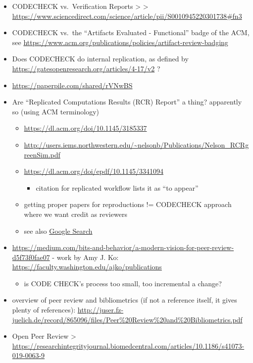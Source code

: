 \documentclass[12pt]{article}
\begin{document}
\begin{itemize}
\item
  CODECHECK vs.~Verification Reports \textgreater{} \textgreater{}
  \url{https://www.sciencedirect.com/science/article/pii/S0010945220301738\#fn3}
\item
  CODECHECK vs.~the ``Artifacts Evaluated - Functional'' badge of the
  ACM, see
  \url{https://www.acm.org/publications/policies/artifact-review-badging}
\item
  Does CODECHECK do internal replication, as defined by
  \url{https://gatesopenresearch.org/articles/4-17/v2} ?
\item
  \url{https://paperpile.com/shared/rVNwBS}
\item
  Are ``Replicated Computations Results (RCR) Report'' a thing?
  apparently so (using ACM terminology)

  \begin{itemize}
  \item
    \url{https://dl.acm.org/doi/10.1145/3185337}
  \item
    \url{http://users.iems.northwestern.edu/~nelsonb/Publications/Nelson_RCRgreenSim.pdf}
  \item
    \url{https://dl.acm.org/doi/epdf/10.1145/3341094}

    \begin{itemize}
    \item
      citation for replicated workflow lists it as ``to appear''
    \end{itemize}
  \item
    getting proper papers for reproductions != CODECHECK approach where
    we want credit as reviewers
  \item
    see also
    \href{https://www.google.com/search?q=\%22Replicated+Computations+Results+\%28RCR\%29+Report+for\%22}{Google
    Search}
  \end{itemize}
\item
  \url{https://medium.com/bits-and-behavior/a-modern-vision-for-peer-review-d5f73f0fae07}
  - work by Amy J. Ko:
  \url{https://faculty.washington.edu/ajko/publications}

  \begin{itemize}
  \item
    is CODE CHECK's process too small, too incremental a change?
  \end{itemize}
\item
  overview of peer review and bibliometrics (if not a reference itself,
  it gives plenty of references):
  \url{http://juser.fz-juelich.de/record/865096/files/Peer\%20Review\%20and\%20Bibliometrics.pdf}
\item
  Open Peer Review \textgreater{}
  \url{https://researchintegrityjournal.biomedcentral.com/articles/10.1186/s41073-019-0063-9}


\end{itemize}
\end{document}
